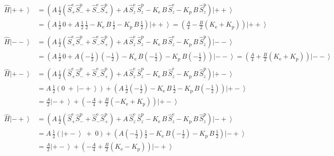 \documentclass[10pt,a4paper]{article}
\newcommand{\const}[1]{\text{#1}}
\newcommand{\ket}[1]{\left| #1 \right>}
\begin{document}
\begin{align*}
    \hat H \ket{++}
    &= \left(A \, \frac{1}{2} \! \left( \hat S_{\!+}^\const{e} \hat S_{\!-}^\const{p} + \hat S_{\!-}^\const{e} \hat S_{\!+}^\const{p} \right) + A \,\hat S_{\!z}^\const{e} \, \hat S_{\!z}^\const{p} - K_\const{e} \, B \, \hat S_{\!z}^\const{e} - K_\const{p} \, B \, \hat S_{\!z}^\const{p}\right) \ket{++} \\
    &= \left( A \, \frac{1}{2} \, 0 + A \,\tfrac{1}{2} \, \tfrac{1}{2} - K_\const{e} \, B \, \tfrac{1}{2} - K_\const{p} \, B \, \tfrac{1}{2} \right) \ket{++}
    = \left( \frac{A}{4} - \frac{B}{2} \left( K_\const{e} + K_\const{p}\right) \right) \ket{++}
    \\\\
    \hat H \ket{--}
    &= \left(A \, \frac{1}{2} \! \left( \hat S_{\!+}^\const{e} \hat S_{\!-}^\const{p} + \hat S_{\!-}^\const{e} \hat S_{\!+}^\const{p} \right) + A \,\hat S_{\!z}^\const{e} \, \hat S_{\!z}^\const{p} - K_\const{e} \, B \, \hat S_{\!z}^\const{e} - K_\const{p} \, B \, \hat S_{\!z}^\const{p}\right) \ket{--} \\
    &= \left( A \, \frac{1}{2} \, 0 + A \left( -\tfrac{1}{2} \right) \left( -\tfrac{1}{2} \right) - K_\const{e} \, B \left( -\tfrac{1}{2} \right) - K_\const{p} \, B \left( -\tfrac{1}{2} \right) \right) \ket{--}
    = \left( \frac{A}{4} + \frac{B}{2} \left( K_\const{e} + K_\const{p}\right) \right) \ket{--}
    \\\\
    \hat H \ket{+-}
    &= \left(A \, \frac{1}{2} \! \left( \hat S_{\!+}^\const{e} \hat S_{\!-}^\const{p} + \hat S_{\!-}^\const{e} \hat S_{\!+}^\const{p} \right) + A \,\hat S_{\!z}^\const{e} \, \hat S_{\!z}^\const{p} - K_\const{e} \, B \, \hat S_{\!z}^\const{e} - K_\const{p} \, B \, \hat S_{\!z}^\const{p}\right) \ket{+-} \\
    &= A \, \frac{1}{2} \! \left( 0 \;+\; \ket{-+} \right) + \left(A \, \tfrac{1}{2} \left( -\tfrac{1}{2} \right) - K_\const{e} \, B \, \tfrac{1}{2} - K_\const{p} \, B \left( -\tfrac{1}{2} \right) \right)\ket{+-} \\
    &= \frac{A}{2} \ket{-+} + \left( - \frac{A}{4} + \frac{B}{2} \left(-K_\const{e} + K_\const{p} \right)\right) \ket{+-}
    \\\\
    \hat H \ket{-+}
    &= \left(A \, \frac{1}{2} \! \left( \hat S_{\!+}^\const{e} \hat S_{\!-}^\const{p} + \hat S_{\!-}^\const{e} \hat S_{\!+}^\const{p} \right) + A \,\hat S_{\!z}^\const{e} \, \hat S_{\!z}^\const{p} - K_\const{e} \, B \, \hat S_{\!z}^\const{e} - K_\const{p} \, B \, \hat S_{\!z}^\const{p}\right) \ket{-+} \\
    &= A \, \frac{1}{2} \! \left( \ket{+-} \;+\; 0 \right) + \left(A \left( -\tfrac{1}{2} \right) \tfrac{1}{2} - K_\const{e} \, B \left( -\tfrac{1}{2} \right) - K_\const{p} \, B \, \tfrac{1}{2} \right)\ket{-+} \\
    &= \frac{A}{2} \ket{+-} + \left( - \frac{A}{4} + \frac{B}{2} \left(K_\const{e} - K_\const{p} \right)\right) \ket{-+}
\end{align*}
\end{document}
